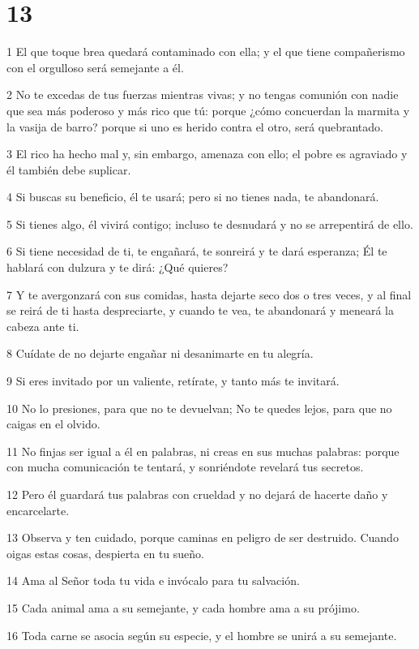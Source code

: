 \chapter{13}

\par 1 El que toque brea quedará contaminado con ella; y el que tiene compañerismo con el orgulloso será semejante a él.
\par 2 No te excedas de tus fuerzas mientras vivas; y no tengas comunión con nadie que sea más poderoso y más rico que tú: porque ¿cómo concuerdan la marmita y la vasija de barro? porque si uno es herido contra el otro, será quebrantado.
\par 3 El rico ha hecho mal y, sin embargo, amenaza con ello; el pobre es agraviado y él también debe suplicar.
\par 4 Si buscas su beneficio, él te usará; pero si no tienes nada, te abandonará.
\par 5 Si tienes algo, él vivirá contigo; incluso te desnudará y no se arrepentirá de ello.
\par 6 Si tiene necesidad de ti, te engañará, te sonreirá y te dará esperanza; Él te hablará con dulzura y te dirá: ¿Qué quieres?
\par 7 Y te avergonzará con sus comidas, hasta dejarte seco dos o tres veces, y al final se reirá de ti hasta despreciarte, y cuando te vea, te abandonará y meneará la cabeza ante ti.
\par 8 Cuídate de no dejarte engañar ni desanimarte en tu alegría.
\par 9 Si eres invitado por un valiente, retírate, y tanto más te invitará.
\par 10 No lo presiones, para que no te devuelvan; No te quedes lejos, para que no caigas en el olvido.
\par 11 No finjas ser igual a él en palabras, ni creas en sus muchas palabras: porque con mucha comunicación te tentará, y sonriéndote revelará tus secretos.
\par 12 Pero él guardará tus palabras con crueldad y no dejará de hacerte daño y encarcelarte.
\par 13 Observa y ten cuidado, porque caminas en peligro de ser destruido. Cuando oigas estas cosas, despierta en tu sueño.
\par 14 Ama al Señor toda tu vida e invócalo para tu salvación.
\par 15 Cada animal ama a su semejante, y cada hombre ama a su prójimo.
\par 16 Toda carne se asocia según su especie, y el hombre se unirá a su semejante.
